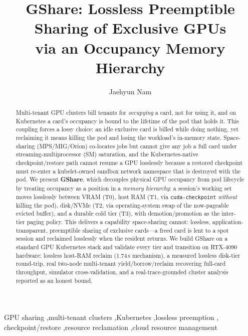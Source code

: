 \documentclass[preprint,12pt]{elsarticle}
\begin{document}
\begin{frontmatter}

\title{GShare: Lossless Preemptible Sharing of Exclusive GPUs\\ via an Occupancy Memory Hierarchy}

\author[du]{Jaehyun Nam}
\address[du]{Dankook University, Republic of Korea}

\begin{abstract}
Multi-tenant GPU clusters bill tenants for \emph{occupying} a card, not for using it, and on
Kubernetes a card's occupancy is bound to the lifetime of the pod that holds it. This coupling forces
a lossy choice: an idle exclusive card is billed while doing nothing, yet reclaiming it means killing
the pod and losing the workload's in-memory state. Space-sharing (MPS/MIG/Orion) co-locates jobs but
cannot give any job a full card under streaming-multiprocessor (SM) saturation, and the
Kubernetes-native checkpoint/restore path cannot resume a GPU losslessly because a restored checkpoint
must re-enter a kubelet-owned sandbox network namespace that is destroyed with the pod. We present
\textbf{GShare}, which decouples physical GPU occupancy from pod lifecycle by treating occupancy as a
position in a \emph{memory hierarchy}: a session's working set moves losslessly between VRAM (T0), host
RAM (T1, via \texttt{cuda-checkpoint} \emph{without} killing the pod), disk/NVMe (T2, via operating-system
swap of the now-pageable evicted buffer), and a durable cold tier (T3), with demotion/promotion as the
inter-tier paging policy. This delivers a capability space-sharing cannot: lossless,
application-transparent, preemptible sharing of exclusive cards---a freed card is lent to a spot
session and reclaimed losslessly when the resident returns. We build GShare on a standard GPU
Kubernetes stack and validate every tier and transition on RTX-4090 hardware: lossless host-RAM reclaim
(1.74\,s mechanism), a measured lossless disk-tier round-trip, real two-node multi-tenant
yield/borrow/reclaim recovering full-card throughput, simulator cross-validation, and a
real-trace-grounded cluster analysis reported as an honest bound.
\end{abstract}

\begin{keyword}
GPU sharing \sep multi-tenant clusters \sep Kubernetes \sep lossless preemption \sep
checkpoint/restore \sep resource reclamation \sep cloud resource management
\end{keyword}

\end{frontmatter}
\end{document}
